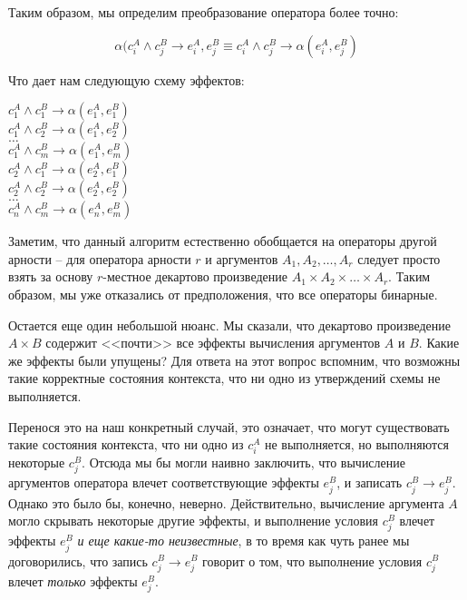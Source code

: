 Таким образом, мы определим преобразование оператора более точно:

$$ \alpha(c^A_i \land c^B_j \rightarrow e^A_i, e^B_j \equiv c^A_i \land c^B_j \rightarrow \alpha(e^A_i, e^B_j) $$

Что дает нам  следующую схему эффектов:

{
    $c^A_1 \land c^B_1 \rightarrow \alpha(e^A_1, e^B_1)$ \\
    $c^A_1 \land c^B_2 \rightarrow \alpha(e^A_1, e^B_2)$ \\
    $\ldots$ \\
    $c^A_1 \land c^B_m \rightarrow \alpha(e^A_1, e^B_m)$ \\
    $c^A_2 \land c^B_1 \rightarrow \alpha(e^A_2, e^B_1)$ \\
    $c^A_2 \land c^B_2 \rightarrow \alpha(e^A_2, e^B_2)$ \\
    $\ldots$ \\
    $c^A_n \land c^B_m \rightarrow \alpha(e^A_n, e^B_m)$ \\
}{}

Заметим, что данный алгоритм естественно обобщается на операторы другой арности -- для оператора арности $r$ и аргументов $A_1, A_2, \ldots, A_r$ следует просто взять за основу $r$-местное декартово произведение $A_1 \times A_2 \times \ldots \times A_r$. Таким образом, мы уже отказались от предположения, что все операторы бинарные.

\bigskip

Остается еще один небольшой нюанс. Мы сказали, что декартово произведение $A \times B$ содержит <<почти>> все эффекты вычисления аргументов $A$ и $B$. Какие же эффекты были упущены? Для ответа на этот вопрос вспомним, что возможны такие корректные состояния контекста, что ни одно из утверждений схемы не выполняется.

Перенося это на наш конкретный случай, это означает, что могут существовать такие состояния контекста, что ни одно из $c^A_i$ не выполняется, но выполняются некоторые $c^B_j$. Отсюда мы бы могли наивно заключить, что вычисление аргументов оператора влечет соответствующие эффекты $e^B_j$, и записать $c^B_j \rightarrow e^B_j$. Однако это было бы, конечно, неверно. Действительно, вычисление аргумента $A$ могло скрывать некоторые другие эффекты, и выполнение условия $c^B_j$ влечет эффекты $e^B_j$ \emph{и еще какие-то неизвестные}, в то время как чуть ранее мы договорились, что запись $c^B_j \rightarrow e^B_j$ говорит о том, что выполнение условия $c^B_j$ влечет \emph{только} эффекты $e^B_j$.

